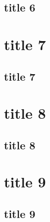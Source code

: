\documentclass[%
]{tudscrreprt}
\begin{document}
\chapter{title 6}
\blindtext
\clearpage

\recalctypearea
\clearpage
\part{title 7}
\chapter{title 7}
\blindtext
\clearpage

\pagestyle{scrheadings}
\part{title 8}
\chapter{title 8}
\blindtext
\clearpage

\pagestyle{tudheadings}
\clearpage
\part{title 9}
\chapter{title 9}
\blindtext
\clearpage


\end{document}
